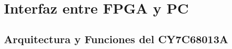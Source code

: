 \chapter{Interfaz entre FPGA y PC}
		
	\section{Arquitectura y Funciones del CY7C68013A}
		


	
%		
%		
%		
%		